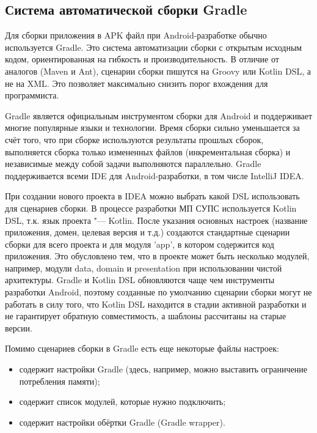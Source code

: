 \subsection{Система автоматической сборки Gradle}
\label{subsec:gradle}

Для сборки приложения в APK файл при Android-разработке обычно используется Gradle.
Это система автоматизации сборки с открытым исходным кодом, ориентированная на гибкость и производительность.
В отличие от аналогов (Maven и Ant), сценарии сборки пишутся на Groovy или Kotlin DSL, а не на XML\@.
Это позволяет максимально снизить порог вхождения для программиста.

Gradle является официальным инструментом сборки для Android и поддерживает многие популярные языки и технологии.
Время сборки сильно уменьшается за счёт того, что при сборке используются результаты прошлых сборок, выполняется сборка только измененных файлов (инкрементальная сборка) и независимые между собой задачи выполняются параллельно.
Gradle поддерживается всеми IDE для Android-разработки, в том числе IntelliJ IDEA\@.

При создании нового проекта в IDEA можно выбрать какой DSL использовать для сценариев сборки.
В процессе разработки МП СУПС используется Kotlin DSL, т.к. язык проекта "--- Kotlin.
После указания основных настроек (название приложения, домен, целевая версия и т.д.) создаются стандартные сценарии сборки для всего проекта и для модуля 'app', в котором содержится код приложения.
Это обусловлено тем, что в проекте может быть несколько модулей, например, модули data, domain и presentation при использовании чистой архитектуры.
Gradle и Kotlin DSL обновляются чаще чем инструменты разработки Android, поэтому созданные по умолчанию сценарии сборки могут не работать в силу того, что Kotlin DSL находится в стадии активной разработки и не гарантирует обратную совместимость, а шаблоны рассчитаны на старые версии.

Помимо сценариев сборки в Gradle есть еще некоторые файлы настроек:
\begin{itemize}
  \item {} содержит настройки Gradle (здесь, например, можно выставить ограничение потребления памяти);
  \item {} содержит список модулей, которые нужно подключить;
  \item {} содержит настройки обёртки Gradle (Gradle wrapper).
\end{itemize}

